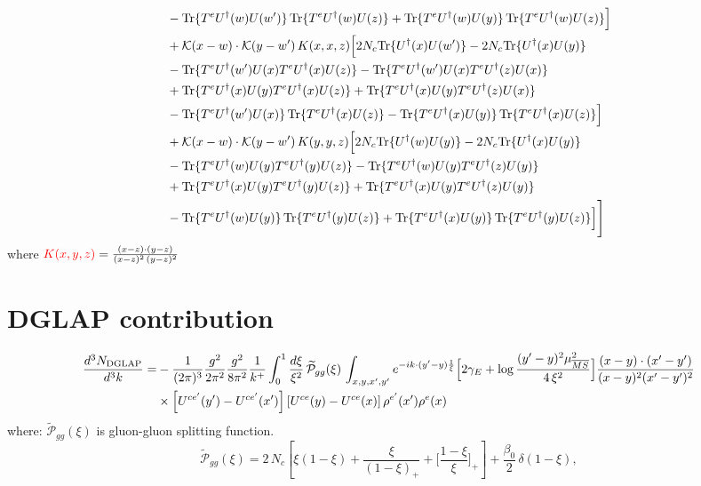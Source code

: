 \documentclass[9pt]{article}
\numberwithin{equation}{section}
\newcommand{\chg}[1]{{\color{red}#1}}
\begin{document}
\begin{align}
&-{\rm Tr}\{T^eU^\dagger(w)U(w')\}\,{\rm Tr}\{T^eU^\dagger(w)U(z)\}+{\rm Tr}\{T^eU^\dagger(w)U(y)\}\,{\rm Tr}\{T^eU^\dagger(w)U(z)\}\Big]\notag\\
&+\mathcal K(x-w)\cdot\mathcal K(y-w')\,K(x,x,z)\Big[2 N_{c}{\rm Tr}\{U^\dagger(x)U(w')\}-2 N_{c}{\rm Tr}\{U^\dagger(x)U(y)\}\notag\\
&-{\rm Tr}\{T^eU^\dagger(w')U(x)T^eU^\dagger(x)U(z)\}-{\rm Tr}\{T^eU^\dagger(w')U(x)T^eU^\dagger(z)U(x)\}\notag\\
&+{\rm Tr}\{T^eU^\dagger(x)U(y)T^eU^\dagger(x)U(z)\}+{\rm Tr}\{T^eU^\dagger(x)U(y)T^eU^\dagger(z)U(x)\}\notag\\
&-{\rm Tr}\{T^eU^\dagger(w')U(x)\}\,{\rm Tr}\{T^eU^\dagger(x)U(z)\}-{\rm Tr}\{T^eU^\dagger(x)U(y)\}\,{\rm Tr}\{T^eU^\dagger(x)U(z)\}\Big]\notag\\
&+\mathcal K(x-w)\cdot\mathcal K(y-w')\,K(y,y,z)\Big[2 N_{c}{\rm Tr}\{U^\dagger(w)U(y)\}-2 N_{c}{\rm Tr}\{U^\dagger(x)U(y)\}\notag\\
&-{\rm Tr}\{T^eU^\dagger(w)U(y)T^eU^\dagger(y)U(z)\}-{\rm Tr}\{T^eU^\dagger(w)U(y)T^eU^\dagger(z)U(y)\}\notag\\
&+{\rm Tr}\{T^eU^\dagger(x)U(y)T^eU^\dagger(y)U(z)\}+{\rm Tr}\{T^eU^\dagger(x)U(y)T^eU^\dagger(z)U(y)\}\notag\\
&-{\rm Tr}\{T^eU^\dagger(w)U(y)\}\,{\rm Tr}\{T^eU^\dagger(y)U(z)\}+{\rm Tr}\{T^eU^\dagger(x)U(y)\}\,{\rm Tr}\{T^eU^\dagger(y)U(z)\}\Big]\Bigg]
\end{align}
where $\chg{K(x,y,z)} = \frac{(x-z)\cdot (y-z)}{(x-z)^{2}\,(y-z)^{2}}$
\section{DGLAP contribution}
\begin{align}
\frac{d^{3}N_{\rm DGLAP}}{d^{3}k}= &-\frac{1}{(2\pi)^{3}}\frac{g^{2}}{2\pi^{2}}\frac{g^{2}}{8\pi^{2}}\frac{1}{k^{+}}\int_{0}^{1}\frac{d\xi}{\xi^{2}}\,\widetilde{\mathcal P}_{gg}(\xi)\,\int_{x,y,x',y'}e^{-ik\cdot(y'-y)\frac{1}{\xi}}\Big[2\gamma_{E}+\log\frac{(y'-y)^{2}\mu^{2}_{\overline{MS}}}{4\,\xi^{2}}\Big]\frac{(x-y)\cdot(x'-y')}{(x-y)^{2}(x'-y')^{2}}\notag\\
&\times\left[U^{ce'}(y') - U^{ce'}(x')\right]\left[U^{ce}(y) - U^{ce}(x)\right]\rho^{e'}(x')\rho^{e}(x)
\end{align}
where:
$\widetilde{\mathcal{P}}_{gg}(\xi)$ is gluon-gluon splitting function.
$$\widetilde{\mathcal{P}}_{gg}(\xi) = 2\,N_{c}\left[\xi(1-\xi) + \frac{\xi}{(1-\xi)_{+}} + \Big[\frac{1-\xi}{\xi}\Big]_{+}\right]+\frac{\beta_{0}}{2}\,\delta(1-\xi),$$
\end{document}
